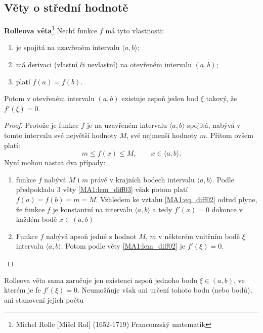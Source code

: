     \subsection{Věty o střední hodnotě}
      \begin{lemma}\label{MA1:lem_diff03}
        \textbf{Rolleova věta}\footnote{Michel Rolle [Mišel Rol] (1652-1719) Francouzský matematik} Nechť funkce $f$ má tyto vlastnosti:
          \begin{enumerate}
            \item je spojitá na uzavřeném intervalu $\langle a,b\rangle$;
            \item má derivaci (vlastní či nevlastní) na otevřeném intervalu $(a,b)$;
            \item platí $f(a)=f(b)$.
          \end{enumerate}
        Potom v otevřeném intervalu $(a,b)$ existuje aspoň jeden bod $\xi$ takový, že $f'(\xi)=0$.   
      \end{lemma}
      \begin{proof}
        Protože je funkce $f$ je na uzavřeném intervalu $\langle a,b\rangle$ spojitá, nabývá v tomto intervalu své největší hodnoty $M$,
        své nejmenší hodnoty $m$. Přitom ovšem platí:
        \begin{equation}\label{MA1:eq_diff02}
          m\leq f(x) \leq M, \qquad x\in\langle a,b\rangle.
        \end{equation}
        Nyní mohou nastat dva případy: 
        \begin{enumerate}
          \item funkce $f$ nabývá $M$ i $m$ právě v krajních bodech intervalu $\langle a,b\rangle$. Podle předpokladu 3 věty \ref{MA1:lem_diff03}
                však potom platí $f(a)=f(b)=m=M$. Vzhledem ke vztahu \ref{MA1:eq_diff02} odtud plyne, že funkce $f$ je konstantní na intervalu
                $\langle a,b\rangle$ a tedy $f'(x)=0$ dokonce v každém bodě $x\in(a,b)$
          \item Funkce $f$ nabývá apsoň jedné z hodnot $M$, $m$ v některém vnitřním bodě $\xi$ intervalu $\langle a,b\rangle$. Potom podle 
          věty \ref{MA1:lem_diff02} je $f'(\xi)=0$.         
        \end{enumerate}        
      \end{proof}
      \begin{note}
        Rolleova věta sama zaručuje jen existenci aspoň jednoho bodu $\xi\in(a,b)$, ve kterém je fe $f'(\xi)=0$. Neumožňuje však ani určení tohoto
        bodu (nebo bodů), ani stanovení jejich počtu 
      \end{note}
      
